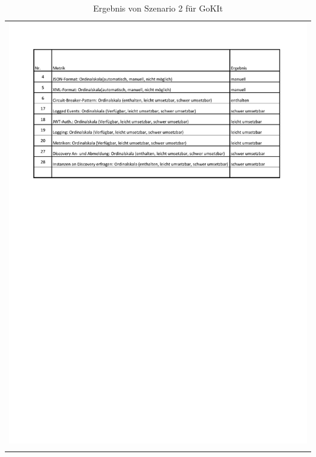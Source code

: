 \begin{longtable}{c}
	\includegraphics[width=\linewidth]{Bilder/Sz2ErgebnisGokit.pdf} \\	
	\caption[Szenario 2 Ergebnis GoKit]{Ergebnis von Szenario 2 für GoKIt}
	\label{Sz2ErgebnisGokit}\\
\end{longtable}
\FloatBarrier    

